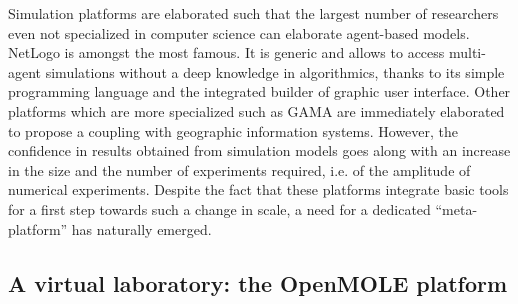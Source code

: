 \documentclass[10pt]{article}
\begin{document}
Simulation platforms are elaborated such that the largest number of researchers even not specialized in computer science can elaborate agent-based models. NetLogo \citep{} is amongst the most famous. It is generic and allows to access multi-agent simulations without a deep knowledge in algorithmics, thanks to its simple programming language and the integrated builder of graphic user interface. Other platforms which are more specialized such as GAMA \citep{grignard2013gama} are immediately elaborated to propose a coupling with geographic information systems. However, the confidence in results obtained from simulation models goes along with an increase in the size and the number of experiments required, i.e. of the amplitude of numerical experiments. Despite the fact that these platforms integrate basic tools for a first step towards such a change in scale, a need for a dedicated ``meta-platform'' has naturally emerged.



\subsection{A virtual laboratory: the OpenMOLE platform}
\end{document}
